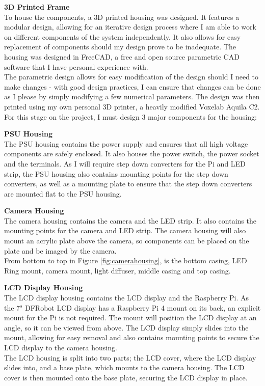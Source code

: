 \vspace{1em}
\noindent
\textbf{3D Printed Frame} \\
To house the components, a 3D printed housing was designed. It features a modular design, allowing for an iterative design process
where I am able to work on different components of the system independently. It also allows for easy replacement of components
should my design prove to be inadequate. The housing was designed in FreeCAD, a free and open source parametric CAD software 
that I have personal experience with. \\
The parametric design allows for easy modification of the design should I need to make changes -
with good design practices, I can ensure that changes can be done as I please by simply modifying a few numerical parameters.
The design was then printed using my own personal 3D printer, a heavily modified Voxelab Aquila C2. For this stage on the project,
I must design 3 major components for the housing:
\begin{mylist}
  \item \textbf{PSU Housing} \\
  The PSU housing contains the power supply and ensures that all high voltage components are safely enclosed.
  It also houses the power switch, the power socket and the terminals. As I will require step down converters for the Pi and LED strip,
  the PSU housing also contains mounting points for the step down converters, as well as a mounting plate to ensure that the step down converters
  are mounted flat to the PSU housing.
  \item \textbf{Camera Housing} \\
  The camera housing contains the camera and the LED strip. It also contains the mounting points for the camera and LED strip.
  The camera housing will also mount an acrylic plate above the camera, so components can be placed on the plate and be imaged by the camera. \\
  From bottom to top in Figure \ref*{fig:camerahousing}, is the bottom casing, LED Ring mount, camera mount, light diffuser, middle casing and
  top casing.
  \item \textbf{LCD Display Housing} \\
  The LCD display housing contains the LCD display and the Raspberry Pi. As the 7" DFRobot LCD display has a Raspberry Pi 4 mount on its back,
  an explicit mount for the Pi is not required. The mount will position the LCD display at an angle, so it can be viewed from above. The LCD display
  simply slides into the mount, allowing for easy removal and also contains mounting points to secure the LCD display to the camera housing. \\
  The LCD housing is split into two parts; the LCD cover, where the LCD display slides into, and a base plate, which mounts to the camera housing.
  The LCD cover is then mounted onto the base plate, securing the LCD display in place.
\end{mylist}
